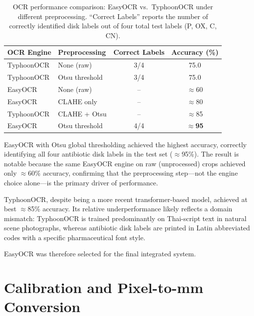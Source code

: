 \begin{table}[H]
  \centering
  \caption{OCR performance comparison: EasyOCR vs.\ TyphoonOCR under different preprocessing.
           ``Correct Labels'' reports the number of correctly identified disk labels
           out of four total test labels (P, OX, C, CN).}
  \label{tab:ocr_comparison}
  \begin{tabular}{llcc}
    \toprule
    \textbf{OCR Engine} & \textbf{Preprocessing} & \textbf{Correct Labels} & \textbf{Accuracy (\%)} \\
    \midrule
    TyphoonOCR  & None (raw)       & 3/4 & 75.0 \\
    TyphoonOCR  & Otsu threshold   & 3/4 & 75.0 \\
    EasyOCR     & None (raw)       & --  & $\approx$60 \\
    EasyOCR     & CLAHE only       & --  & $\approx$80 \\
    TyphoonOCR  & CLAHE + Otsu     & --  & $\approx$85 \\
    EasyOCR     & Otsu threshold   & 4/4 & $\approx$\textbf{95} \\
    \bottomrule
  \end{tabular}
\end{table}

EasyOCR with Otsu global thresholding achieved the highest accuracy,
correctly identifying all four antibiotic disk labels in the test set ($\approx$95\%).
The result is notable because the same EasyOCR engine on raw (unprocessed) crops
achieved only $\approx$60\% accuracy,
confirming that the preprocessing step---not the engine choice alone---is the primary
driver of performance.

TyphoonOCR, despite being a more recent transformer-based model,
achieved at best $\approx$85\% accuracy.
Its relative underperformance likely reflects a domain mismatch:
TyphoonOCR is trained predominantly on Thai-script text in natural scene photographs,
whereas antibiotic disk labels are printed in Latin abbreviated codes with a
specific pharmaceutical font style.

EasyOCR was therefore selected for the final integrated system.

\section{Calibration and Pixel-to-mm Conversion}
\label{sec:calibration}

